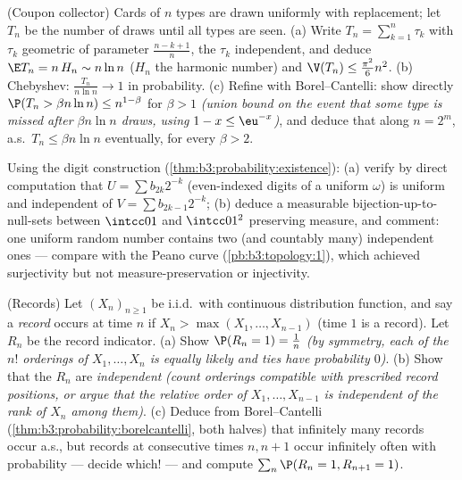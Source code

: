 \begin{exercise}[$\star\star\star$]\label{exo:b3:probability:9}
(Coupon collector) Cards of $n$ types are drawn uniformly
with replacement; let $T_n$ be the number of draws until all
types are seen.
(a) Write $T_n = \sum_{k=1}^{n}\tau_k$ with $\tau_k$
geometric of parameter $\frac{n - k + 1}n$, the $\tau_k$
independent, and deduce $\E T_n = n\,H_n \sim n\ln n$
($H_n$ the harmonic number) and $\V(T_n) \leq
\frac{\pi^2}6n^2$.
(b) Chebyshev: $\frac{T_n}{n\ln n} \to 1$ in probability.
(c) Refine with Borel--Cantelli: show directly $\P(T_n >
\beta n\ln n) \leq n^{1 - \beta}$ for $\beta > 1$
\emph{(union bound on the event that some type is missed
after $\beta n\ln n$ draws, using $1 - x \leq \eu^{-x}$)},
and deduce that along $n = 2^m$, a.s.\ $T_n \leq \beta n\ln
n$ eventually, for every $\beta > 2$.
\end{exercise}

\begin{exercise}[$\star\star$]\label{exo:b3:probability:10}
Using the digit construction
(\cref{thm:b3:probability:existence}):
(a) verify by direct computation that $U = \sum b_{2k}2^{-k}$
(even-indexed digits of a uniform $\omega$) is uniform and
independent of $V = \sum b_{2k-1}2^{-k}$;
(b) deduce a measurable bijection-up-to-null-sets between
$\intcc01$ and $\intcc01^2$ preserving measure, and comment:
one uniform random number contains two (and countably many)
independent ones --- compare with the Peano curve
(\cref{pb:b3:topology:1}), which achieved surjectivity but
not measure-preservation or injectivity.
\end{exercise}

\begin{exercise}[$\star\star$]\label{exo:b3:probability:11}
(Records) Let $(X_n)_{n\geq1}$ be i.i.d.\ with continuous
distribution function, and say a \emph{record} occurs at
time $n$ if $X_n > \max(X_1, \dots, X_{n-1})$ (time $1$ is
a record). Let $R_n$ be the record indicator.
(a) Show $\P(R_n = 1) = \frac1n$ \emph{(by symmetry, each of
the $n!$ orderings of $X_1, \dots, X_n$ is equally likely
and ties have probability $0$)}.
(b) Show that the $R_n$ are \emph{independent} \emph{(count
orderings compatible with prescribed record positions, or
argue that the relative order of $X_1, \dots, X_{n-1}$ is
independent of the rank of $X_n$ among them)}.
(c) Deduce from Borel--Cantelli
(\cref{thm:b3:probability:borelcantelli}, both halves) that
infinitely many records occur a.s., but records at
consecutive times $n, n+1$ occur infinitely often with
probability --- decide which! --- and compute
$\sum_n\P(R_n = 1, R_{n+1} = 1)$.
\end{exercise}

